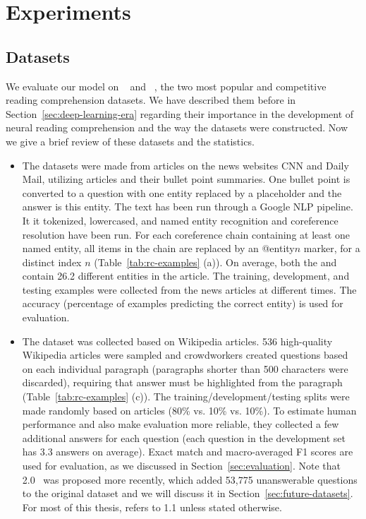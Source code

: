 
\section{Experiments}
\label{sec:sar-experiments}

\subsection{Datasets}

We evaluate our model on ~\cite{hermann2015teaching} and ~\cite{rajpurkar2016squad}, the two most popular and competitive reading comprehension datasets. We have described them before in Section~\ref{sec:deep-learning-era} regarding their importance in the development of neural reading comprehension and the way the datasets were constructed. Now we give a brief review of these datasets and the statistics.

\begin{itemize}
\item
The  datasets were made from articles on the news websites CNN and Daily Mail, utilizing articles and their bullet point summaries. One bullet point is converted to a question with one entity replaced by a placeholder and the answer is this entity. The text has been run through a Google NLP pipeline. It it tokenized, lowercased, and named entity recognition and coreference resolution have been run. For each coreference chain containing at least one named entity, all items in the chain are replaced by an @entity$n$ marker, for a distinct index $n$ (Table~\ref{tab:rc-examples} (a)). On average, both the  and  contain 26.2 different entities in the article. The training, development, and testing examples were collected from the news articles at different times. The accuracy (percentage of examples predicting the correct entity) is used for evaluation.

\item
The  dataset was collected based on Wikipedia articles. 536 high-quality Wikipedia articles were sampled and crowdworkers created questions based on each individual paragraph (paragraphs shorter than 500 characters were discarded), requiring that answer must be highlighted from the paragraph (Table~\ref{tab:rc-examples} (c)). The training/development/testing splits were made randomly based on articles (80\% vs. 10\% vs. 10\%). To estimate human performance and also make evaluation more reliable, they collected a few additional answers for each question (each question in the development set has 3.3 answers on average). Exact match and macro-averaged F1 scores are used for evaluation, as we discussed in Section~\ref{sec:evaluation}. Note that  2.0~\cite{rajpurkar2018know} was proposed more recently, which added 53,775 unanswerable questions to the original dataset and we will discuss it in Section~\ref{sec:future-datasets}. For most of this thesis,  refers to  1.1 unless stated otherwise.
\end{itemize}


